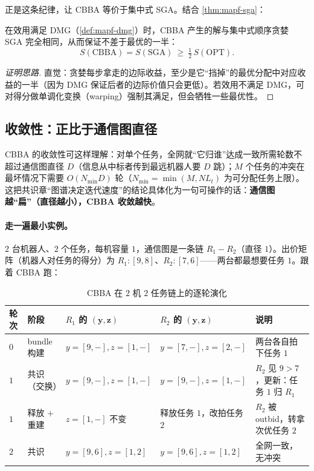 正是这条纪律，让 CBBA 等价于集中式 SGA。结合 \cref{thm:mapf-sga}：

\begin{theorem}[CBBA $=$ SGA 与 $50\%$ 界]\label{thm:mapf-cbba}
在效用满足 DMG（\cref{def:mapf-dmg}）时，CBBA 产生的解与集中式顺序贪婪 SGA 完全相同，从而保证不差于最优的一半\cite{choi2009cbba}：
\begin{equation}
  S(\mathrm{CBBA})=S(\mathrm{SGA})\ \ge\ \tfrac12\,S(\mathrm{OPT}).
  \label{eq:mapf-cbba-half}
\end{equation}
\end{theorem}

\begin{proof}[证明思路]
直觉：贪婪每步拿走的边际收益，至少是它“挡掉”的最优分配中对应收益的一半（因为 DMG 保证后者的边际价值只会更低）。若效用不满足 DMG，可对得分做单调化变换（warping）强制其满足，但会牺牲一些最优性。
\end{proof}

\subsection{收敛性：正比于通信图直径}
\label{sec:mapf-cbba-converge}

CBBA 的收敛性可这样理解：对单个任务，全网就“它归谁”达成一致所需轮数不超过通信图直径 $D$（信息从中标者传到最远机器人要 $D$ 跳）；$M$ 个任务的冲突在最坏情况下需要 $O(N_{\min}D)$ 轮（$N_{\min}=\min(M,NL_t)$ 为可分配任务上限）\cite{choi2009cbba}。这把共识章“图谱决定迭代速度”的结论具体化为一句可操作的话：\textbf{通信图越“扁”（直径越小），CBBA 收敛越快}。

\paragraph{走一遍最小实例。}
$2$ 台机器人、$2$ 个任务，每机容量 $1$，通信图是一条链 $R_1\!-\!R_2$（直径 $1$）。出价矩阵（机器人对任务的得分）为 $R_1:[9,8]$、$R_2:[7,6]$——两台都最想要任务 $1$。跟着 CBBA 跑：

\begin{table}[H]\centering\small
\caption{CBBA 在 $2$ 机 $2$ 任务链上的逐轮演化}
\label{tab:mapf-cbba-trace}
\begin{tabular}{lllll}
\toprule
轮次 & 阶段 & $R_1$ 的 $(\mathbf{y},\mathbf{z})$ & $R_2$ 的 $(\mathbf{y},\mathbf{z})$ & 说明 \\
\midrule
$0$ & bundle 构建 & $y{=}[9,-],z{=}[1,-]$ & $y{=}[7,-],z{=}[2,-]$ & 两台各自拍下任务 $1$ \\
$1$ & 共识（交换） & $y{=}[9,-],z{=}[1,-]$ & $y{=}[9,-],z{=}[1,-]$ & $R_2$ 见 $9>7$，更新：任务 $1$ 归 $R_1$ \\
$1$ & 释放 $+$ 重建 & $z{=}[1,-]$ 不变 & 释放任务 $1$，改拍任务 $2$ & $R_2$ 被 outbid，转拿次优任务 $2$ \\
$2$ & 共识 & $y{=}[9,6],z{=}[1,2]$ & $y{=}[9,6],z{=}[1,2]$ & 全网一致，无冲突 \\
\bottomrule
\end{tabular}
\end{table}

